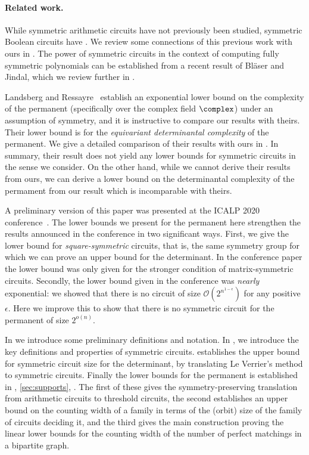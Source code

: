 \documentclass{toc}
\begin{document}
\paragraph*{Related work.}
While symmetric arithmetic circuits have not previously been studied, symmetric
Boolean circuits have \cite{DenenbergGS86,Otto96,AndersonD17,Rossman19}.  
We review some connections of this previous work with ours in 
.  The power of symmetric circuits in the
context of computing fully symmetric polynomials can be established from
a recent result of Bl\"{a}ser and Jindal, which we review further in
.

Landsberg and Ressayre~\cite{LandsbergR16}
establish an exponential lower bound on the complexity of the permanent
(specifically over the complex field $\complex$) under an assumption of
symmetry, and it is instructive to compare our results with theirs. Their lower
bound is for the \emph{equivariant determinantal complexity} of the permanent.  We give a detailed comparison of their results with ours in .  In summary, their result does not yield any lower bounds for symmetric
circuits in the sense we consider.  On the other hand, while we cannot derive their results from ours, we can derive a lower bound on the determinantal complexity of the permament
%
%
from our result which is incomparable with theirs. 


A preliminary version of this %
paper  %
was presented at the ICALP 2020
%
conference~\cite{conf-version}.
The lower bounds we present for the permanent here strengthen the results announced in the conference in two significant ways.  First, we give the lower bound for \emph{square-symmetric} circuits, that is, the same symmetry group for which we can prove an upper bound for the determinant.  In the conference paper the lower bound was only given for the stronger condition of matrix-symmetric circuits.  Secondly, the lower bound given in the conference was \emph{nearly} exponential: we showed that there is no circuit of size $\mathcal{O}(2^{n^{1-\epsilon}})$ for any positive $\epsilon$.  Here we improve this to show that there is no symmetric circuit for the permanent of size $2^{o(n)}$.

In  we introduce some
preliminary definitions and notation. In , we
introduce the key definitions and properties of symmetric circuits.
 establishes the upper bound for symmetric circuit
size for the determinant, by translating Le Verrier's method to symmetric
circuits. Finally the lower bounds for the permanent is established in
, \ref{sec:supports},
. The first of these gives the symmetry-preserving
translation from arithmetic circuits to threshold circuits, the second
establishes an %
upper bound  %
on the counting width of a family in terms of the
(orbit) size of the family of circuits deciding it, and the third gives the main
construction proving the linear lower bounds for the counting width of the
number of perfect matchings in a bipartite graph.
\end{document}
